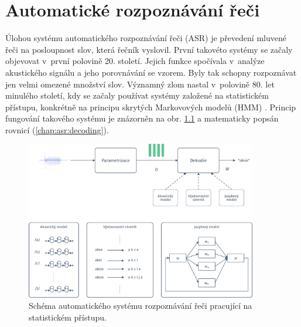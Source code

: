 \chapter{Automatické rozpoznávání řeči}
\label{chap:asr}

Úlohou systému automatického rozpoznávání řeči (ASR) je převedení mluvené řeči na posloupnost slov, která řečník vyslovil. První takovéto systémy se začaly objevovat v~první polovině 20. století. Jejich funkce spočívala v~analýze akustického signálu a jeho porovnávání se vzorem. Byly tak schopny rozpoznávat jen velmi omezené množství slov. Významný zlom nastal v~polovině 80. let minulého století, kdy se začaly používat systémy založené na statistickém přístupu, konkrétně na principu skrytých Markovových modelů (HMM) \cite{Holmes2001}.
Princip fungování takového systému je znázorněn na obr. \ref{fig:asr:decoding} a matematicky popsán rovnicí (\ref{chap:asr:decoding}).

\begin{figure}[hbpt]
  \centering
  \includegraphics[width=0.9\textwidth]{./parts/ch4-asr/img/decoding.pdf}
  \caption[Schéma ASR systému pracující se statistickou.]{Schéma automatického systému rozpoznávání řeči pracující na statistickém přístupu.}
  \label{fig:asr:decoding}
\end{figure}

